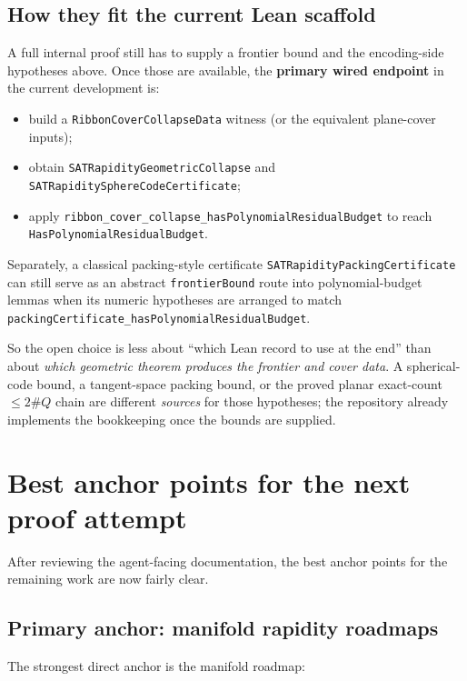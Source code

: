 \documentclass[11pt]{article}
\begin{document}
\subsection*{How they fit the current Lean scaffold}

A full internal proof still has to supply a frontier bound and the encoding-side hypotheses above.
Once those are available, the \textbf{primary wired endpoint} in the current development is:

\begin{itemize}[leftmargin=2em]
  \item build a \texttt{RibbonCoverCollapseData} witness (or the equivalent plane-cover inputs);
  \item obtain \texttt{SATRapidityGeometricCollapse} and \texttt{SATRapiditySphereCodeCertificate};
  \item apply \texttt{ribbon\_cover\_collapse\_hasPolynomialResidualBudget} to reach
  \texttt{HasPolynomialResidualBudget}.
\end{itemize}

\noindent
Separately, a classical packing-style certificate \texttt{SATRapidityPackingCertificate} can still
serve as an abstract \texttt{frontierBound} route into polynomial-budget lemmas when its numeric
hypotheses are arranged to match \texttt{packingCertificate\_hasPolynomialResidualBudget}.

\medskip
\noindent
So the open choice is less about ``which Lean record to use at the end'' than about \emph{which
geometric theorem produces the frontier and cover data}.  A spherical-code bound, a tangent-space
packing bound, or the proved planar exact-count \(\le 2\#Q\) chain are different \emph{sources} for
those hypotheses; the repository already implements the bookkeeping once the bounds are supplied.

\section{Best anchor points for the next proof attempt}

After reviewing the agent-facing documentation, the best anchor points for the remaining work are
now fairly clear.

\subsection{Primary anchor: manifold rapidity roadmaps}

The strongest direct anchor is the manifold roadmap:
\end{document}
